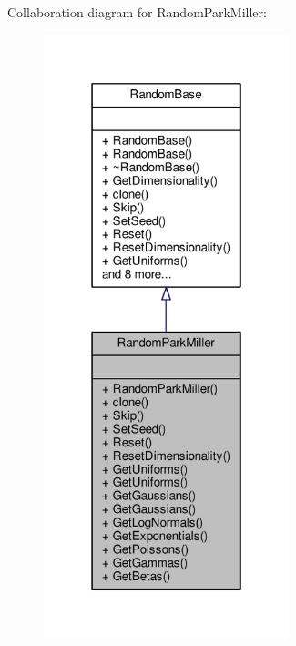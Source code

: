 Collaboration diagram for Random\+Park\+Miller\+:
\nopagebreak
\begin{figure}[H]
\begin{center}
\leavevmode
\includegraphics[width=202pt]{classRandomParkMiller__coll__graph}
\end{center}
\end{figure}
